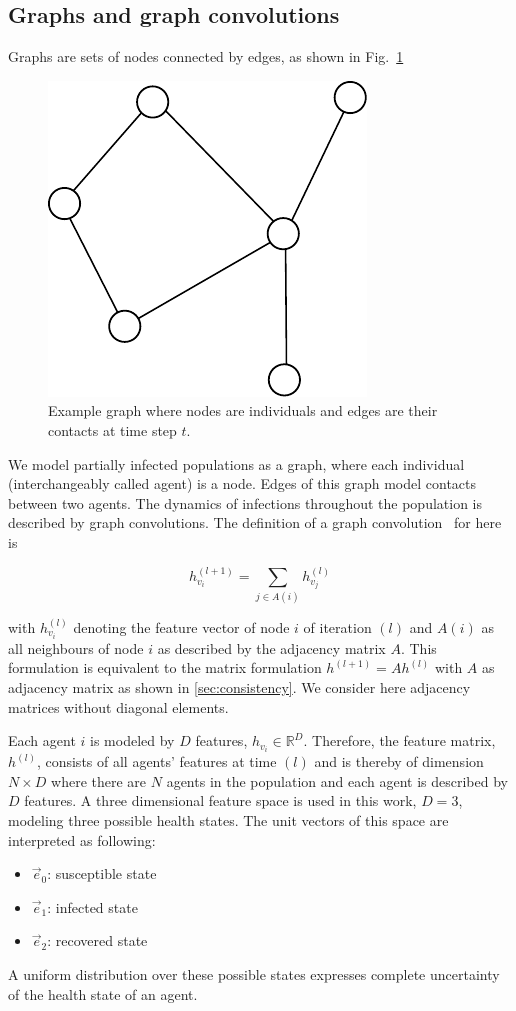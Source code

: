 \subsection{Graphs and graph convolutions}

Graphs are sets of nodes connected by edges, as shown in Fig.~\ref{fig:graph_example}

\begin{figure}[H]
	\centering
	\includegraphics[width=0.4\columnwidth]{img/graph_example.pdf}
	\caption{Example graph where nodes are individuals and edges are their contacts at time step $t$.}
	\label{fig:graph_example}
\end{figure}

We model partially infected populations as a graph, where each individual (interchangeably called agent) is a node. Edges of this graph model contacts between two agents. The dynamics of infections throughout the population is described by graph convolutions. The definition of a graph convolution~\cite{Kipf2017SemiSupervisedCW} for here is

\begin{equation}
	\label{eq:graph_convolution}
	h_{v_i}^{(l+1)} = \sum_{j\in A(i)} h_{v_j}^{(l)}
\end{equation}

with $h_{v_i}^{(l)}$ denoting the feature vector of node $i$ of iteration $(l)$ and $A(i)$ as all neighbours of node $i$ as described by the adjacency matrix $A$. This formulation is equivalent to the matrix formulation $h^{(l+1)} = A h^{(l)}$ with $A$ as adjacency matrix as shown in \ref{sec:consistency}. We consider here adjacency matrices without diagonal elements.

Each agent $i$ is modeled by $D$ features, $h_{v_i} \in \mathbb{R}^D$. Therefore, the feature matrix, $h^{(l)}$, consists of all agents' features at time $(l)$ and is thereby of dimension $N\times D$ where there are $N$ agents in the population and each agent is described by $D$ features. A three dimensional feature space is used in this work, $D=3$, modeling three possible health states. The unit vectors of this space are interpreted as following:
\begin{itemize}
	\item $\vec{e}_0$: susceptible state
	\item $\vec{e}_1$: infected state
	\item $\vec{e}_2$: recovered state
\end{itemize}
A uniform distribution over these possible states expresses complete uncertainty of the health state of an agent.

